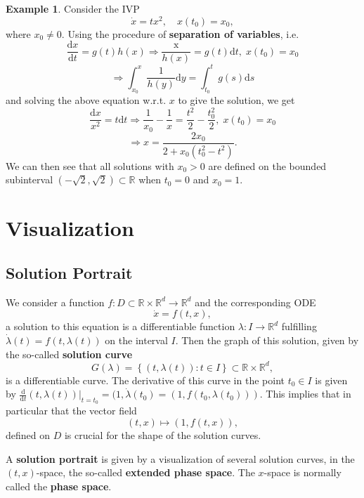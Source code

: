 \documentclass[12pt]{report}
\theoremstyle{definition}
\begin{document}
\newtheorem{Solutions do not need to exist for all times}[theorem]{Example}
\begin{Solutions do not need to exist for all times}
    Consider the IVP
    \[
        \dot{x}=tx^{2}, \quad x(t_0)=x_0,
    \]
    where $x_0\neq 0$. Using the procedure of \textbf{separation of variables},
    i.e.\
    \[
        \frac{\mathrm{d}x}{\mathrm{d}t}=g(t)h(x) \Rightarrow
        \frac{\mathrm{x}}{h(x)}=g(t)\mathrm{d}t,\; x(t_0)=x_0
    \]
    \[
        \Rightarrow \int_{x_0}^{x} \frac{1}{h(y)}\mathrm{d}y
        = \int_{t_0}^{t} g(s)\mathrm{d}s
    \]
    and solving the above equation w.r.t. $x$ to give the solution,
    we get
    \[
        \frac{\mathrm{d}x}{x^{2}}=t\mathrm{d}t\Rightarrow
        \frac{1}{x_0}-\frac{1}{x}=\frac{t^{2}}{2}-\frac{t_0^{2}}{2},
        \;x(t_0)=x_0
    \]
    \[
        \Rightarrow x=\frac{2x_0}{2+x_0(t_0^{2}-t^{2})}.
    \]
    We can then see that all solutions with $x_0>0$ are defined on the bounded
    subinterval $(-\sqrt{2}, \sqrt{2})\subset\mathbb{R}$ when $t_0=0$ and $x_0=1$.
\end{Solutions do not need to exist for all times}

\section{Visualization}

\subsection{Solution Portrait}

We consider a function
$f:D\subset\mathbb{R}\times\mathbb{R}^{d}\rightarrow\mathbb{R}^{d}$
and the corresponding ODE
\[
    \dot{x}=f(t,x),
\]
a solution to this equation is a differentiable function
$\lambda:I\rightarrow\mathbb{R}^{d}$ fulfilling
$\dot{\lambda}(t)=f(t,\lambda(t))$ on the interval $I$.
Then the graph of this solution, given by the so-called 
\textbf{solution curve}
\[
    G(\lambda)=\left\{(t,\lambda(t)):t\in I\right\}
    \subset\mathbb{R}\times\mathbb{R}^{d},
\]
is a differentiable curve. The derivative of this curve in the point
$t_0\in I$ is given by 
$\frac{\mathrm{d}}{\mathrm{d}t}(t,\lambda(t))|_{t=t_0}=(1,\dot{\lambda}(t_0)
= (1, f(t_0, \lambda(t_0)))$.
This implies that in particular that the vector field
\[
    (t,x)\mapsto(1,f(t,x)),
\]
defined on $D$ is crucial for the shape of the solution curves.

\medskip
\noindent A \textbf{solution portrait} is given by a visualization of several solution
curves, in the $(t,x)$-space, the so-called \textbf{extended phase space}.
The $x$-space is normally called the \textbf{phase space}.
\end{document}
